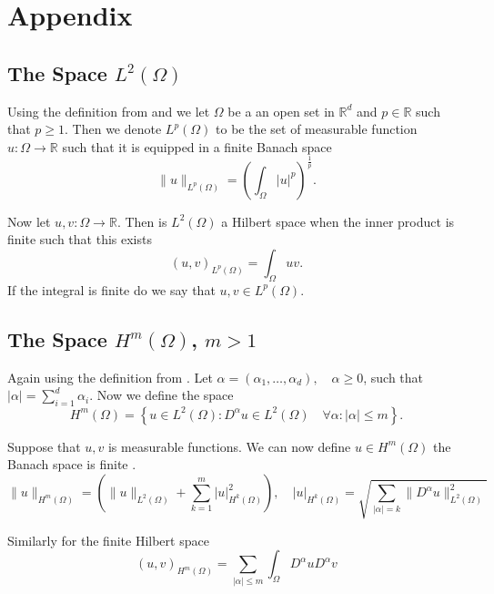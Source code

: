 \newpage
\section{Appendix}%
\label{sec:appendix}

\subsection{The Space $L^{2} \left( \Omega  \right)$ }%
\label{sub:l_2_space}

Using the definition from \cite{manzoni2021optimal} and we let $\Omega $ be a an open set in $\mathbb{R} ^{d}$ and $p \in \mathbb{R} $  such that $p \ge 1$. Then we denote
$L^{p}\left( \Omega  \right) $ to be the set of measurable function $u: \Omega \to \mathbb{R} $ such that  it is equipped
in a finite Banach space \[
\|u\|_{L^{p}\left( \Omega  \right)}^{} = \left( \int_{\Omega }^{} \left\lvert u \right\rvert ^{p}
\right)^{\frac{1}{p}}.
\]

Now let $u,v: \Omega  \to \mathbb{R} $. Then is $L^{2}\left( \Omega  \right)$ a Hilbert space when the inner product is
finite such that this exists \[
\left( u,v \right)_{L^{p}\left( \Omega   \right)} = \int_{\Omega }^{} uv  .
\]
If the integral is finite do we say that $u,v \in L^{p}\left( \Omega  \right)$.



\subsection{The Space $H^{m} \left( \Omega  \right)$, $m>1$  }%
\label{sub:h_2_space}

Again using the definition from \cite{manzoni2021optimal}. Let $\alpha=\left( \alpha _{1}, \ldots, \alpha _{d} \right),
\quad \alpha \ge  0$, such that $\left\lvert \alpha  \right\rvert = \sum_{i=1}^{d} \alpha _{i} $. Now we define
the space \[
H^{m}\left( \Omega  \right) = \left\{ u \in L^2\left( \Omega  \right) : D^{\alpha } u \in L^2\left( \Omega  \right)\quad
\forall \alpha : \left\lvert \alpha  \right\rvert  \le  m \right\}.
\]


Suppose that $u,v$ is measurable functions. We can now define $u \in H^{m}\left( \Omega  \right)$  the Banach space is
finite . \[
\|u\|_{H^{m}\left( \Omega  \right)}^{} = \left( \|u\|_{L^2\left( \Omega  \right)}^{}  + \sum_{k=1}^{m}
\left\lvert u \right\rvert ^2 _{H^{k}\left( \Omega  \right)} \right), \quad \left\lvert u \right\rvert_ { H^{k} \left(
\Omega  \right) }  = \sqrt{\sum_{\left\lvert \alpha  \right\rvert = k  }^{} \| D^{\alpha }u \|_{L^2\left( \Omega  \right)
}^{ 2 } }
 \]

 Similarly for the finite Hilbert space \[
 \left( u,v \right)_{ H^{m} \left( \Omega  \right)}  = \sum_{\left\lvert \alpha  \right\rvert  \le  m}^{}  \int_{\Omega }^{}
 D^{\alpha } u D^{\alpha } v
 \]







